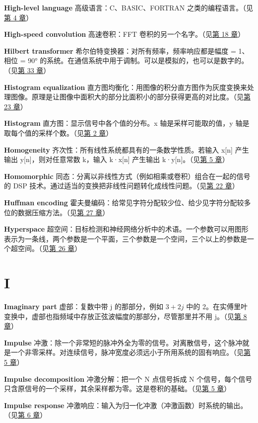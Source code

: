 \textbf{High-level language} 高级语言：C、BASIC、FORTRAN
之类的编程语言。（见\hyperref[ch-04]{第 4 章}）

\textbf{High-speed convolution} 高速卷积：FFT
卷积的另一个名字。（见\hyperref[ch-18]{第 18 章}）

\textbf{Hilbert transformer}
希尔伯特变换器：对所有频率，频率响应都是幅度 = 1、相位 = 90°
的系统。在通信系统中用于调制。可以是模拟的，也可以是数字的。（见\hyperref[ch-33]{第
33 章}）

\textbf{Histogram equalization}
直方图均衡化：用图像的积分直方图作为灰度变换来处理图像。原理是让图像中面积大的部分比面积小的部分获得更高的对比度。（见\hyperref[ch-23]{第
23 章}）

\textbf{Histogram} 直方图：显示信号中各个值的分布。x
轴是采样可能取的值，y 轴是取每个值的采样个数。（见\hyperref[ch-02]{第 2
章}）

\textbf{Homogeneity} 齐次性：所有线性系统都具有的一条数学性质。若输入
x{[}n{]} 产生输出 y{[}n{]}，则对任意常数 k，输入 k·x{[}n{]} 产生输出
k·y{[}n{]}。（见\hyperref[ch-05]{第 5 章}）

\textbf{Homomorphic}
同态：分离以非线性方式（例如相乘或卷积）组合在一起的信号的 DSP
技术。通过适当的变换把非线性问题转化成线性问题。（见\hyperref[ch-22]{第
22 章}）

\textbf{Huffman encoding}
霍夫曼编码：给常见字符分配较少位、给少见字符分配较多位的数据压缩方法。（见\hyperref[ch-27]{第
27 章}）

\textbf{Hyperspace}
超空间：目标检测和神经网络分析中的术语。一个参数可以用图形表示为一条线，两个参数是一个平面，三个参数是一个空间，三个以上的参数是一个超空间。（见\hyperref[ch-26]{第
26 章}）

\section{I}

\textbf{Imaginary part} 虚部：复数中带 j 的那部分，例如 \(3+2j\) 中的
2。在实傅里叶变换中，虚部也指频域中存放正弦波幅度的那部分，尽管那里并不用
j。（见\hyperref[ch-08]{第 8 章}）

\textbf{Impulse}
冲激：除一个非常短的脉冲外全为零的信号。对离散信号，这个脉冲就是一个非零采样。对连续信号，脉冲宽度必须远小于所用系统的固有响应。（见\hyperref[ch-05]{第
5 章}）

\textbf{Impulse decomposition} 冲激分解：把一个 N 点信号拆成 N
个信号，每个信号只含原信号的一个采样，其余采样都为零。这是卷积的基础。（见\hyperref[ch-05]{第
5 章}）

\textbf{Impulse response}
冲激响应：输入为归一化冲激（冲激函数）时系统的输出。（见\hyperref[ch-06]{第
6 章}）

